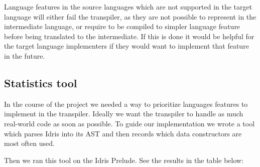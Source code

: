 \documentclass[parskip=half]{scrartcl}
\begin{document}
Language features in the source languages which are not supported in the target
language will either fail the transpiler, as they are not possible to represent
in the intermediate language, or require to be compiled to simpler
language feature before being translated to the intermediate. If this is
done it would be helpful for the target language implementers if they would
want to implement that feature in the future.


\subsection{Statistics tool}
In the course of the project we needed a way to prioritize languages features
to implement in the transpiler. Ideally we want the transpiler to handle
as much real-world code as soon as possible. To guide our implementation we
wrote a tool which parses Idris into its AST and then records which data
constructors are most often used.

Then we ran this tool on the Idris Prelude. See the results in the table below:
\end{document}
